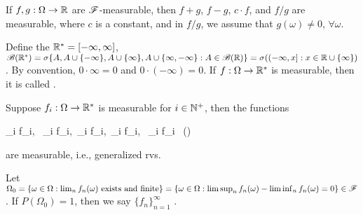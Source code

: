 \documentclass[10pt,a4paper]{article}
\begin{document}
\begin{thmbox}
	\begin{theorem}\label{thm:oper-mea}\rm
		If $f,g:\Omega\to\mathbb R$ are $\mathscr{F}$-measurable, then $f+g$, $f-g$, $c\cdot f$, and $f/g$ are measurable, where $c$ is a constant, and in $f/g$, we assume that $g(\omega)\neq 0$, $\forall\omega$.           		
	\end{theorem}
\end{thmbox}

Define the  $\mathbb R^*=[-\infty ,\infty ]$, $\mathscr{B}(\mathbb R^*)=\sigma\{A,A\cup\{-\infty \},A\cup\{\infty \}, A\cup\{\infty ,-\infty \}:A\in\mathscr{B}(\mathbb R)\}=\sigma((-\infty ,x]:x\in\mathbb R\cup\{\infty \})$. By convention, $0\cdot \infty =0$ and $0\cdot(-\infty )=0$. If $f:\Omega\to\mathbb R^*$ is measurable, then it is called .   

\begin{thmbox}
	\begin{theorem}\label{thm:max-mea}\rm
		Suppose $f_i:\Omega\to\mathbb R^*$ is measurable for $i\in\mathbb N^+$, then the functions
		\begin{sequation*}
			\inf_i f_i, \ \sup_i f_i,\ \liminf_i f_i,\ \limsup_i f_i, \ \lim_i f_i \ ()
		\end{sequation*}
		 are measurable, i.e., generalized rvs.       
	\end{theorem}
\end{thmbox}
Let $\Omega_0=\{\omega\in\Omega:\lim_n f_n(\omega) \text{ exists and finite}\}=\{\omega\in\Omega:\limsup_n f_n(\omega)-\liminf_n f_n(\omega)=0\}\in\mathscr{F}$. If $P(\Omega_0)=1$, then we say $\{f_n\}_{n=1}^\infty $ .   
\end{document}

